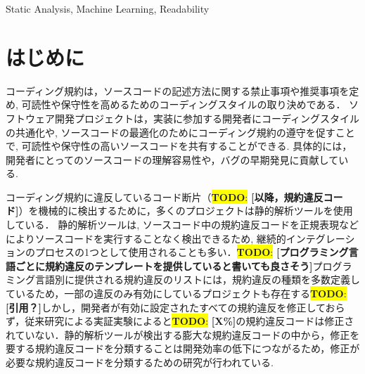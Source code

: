 \documentclass[submit]{ipsj}
\newcommand{\todo}[1]{\colorbox{yellow}{{\bf TODO}:}{\color{red} {\textbf{[#1]}}}}
\begin{document}
\begin{ekeyword}
Static Analysis, Machine Learning, Readability
\end{ekeyword}

\maketitle

\section{はじめに}

コーディング規約は，ソースコードの記述方法に関する禁止事項や推奨事項を定め, 可読性や保守性を高めるためのコーディングスタイルの取り決めである．
ソフトウェア開発プロジェクトは，実装に参加する開発者にコーディングスタイルの共通化や, ソースコードの最適化のためにコーディング規約の遵守を促すことで, 可読性や保守性の高いソースコードを共有することができる\cite{EffectsSAT}. 具体的には，開発者にとってのソースコードの理解容易性や，バグの早期発見に貢献している\cite{Beller2}\cite{Johnson}\cite{Beller}.


コーディング規約に違反しているコード断片（\todo{以降，規約違反コード}）を機械的に検出するために，多くのプロジェクトは静的解析ツールを使用している．
静的解析ツールは, ソースコード中の規約違反コードを正規表現などによりソースコードを実行することなく検出できるため, 継続的インテグレーションのプロセスの1つとして使用されることも多い．\todo{プログラミング言語ごとに規約違反のテンプレートを提供していると書いても良さそう}プログラミング言語別に提供される規約違反のリストには，規約違反の種類を多数定義しているため，一部の違反のみ有効にしているプロジェクトも存在する\todo{引用？}しかし，開発者が有効に設定されたすべての規約違反を修正しておらず，従来研究による実証実験によると\todo{X\%}の規約違反コードは修正されていない．静的解析ツールが検出する膨大な規約違反コードの中から，修正を要する規約違反コードを分類することは開発効率の低下につながるため，修正が必要な規約違反コードを分類するための研究が行われている\cite{Nguyen}.
\end{document}

